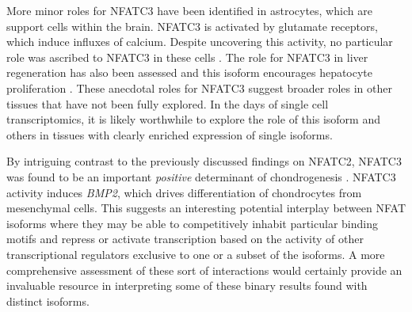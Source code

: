 More minor roles for NFATC3 have been identified in astrocytes, which are support cells within the brain. NFATC3 is activated by glutamate receptors, which induce influxes of calcium. Despite uncovering this activity, no particular role was ascribed to NFATC3 in these cells \citep{Jones2003}. The role for NFATC3 in liver regeneration has also been assessed and this isoform encourages hepatocyte proliferation \citep{Pierre2009}. These anecdotal roles for NFATC3 suggest broader roles in other tissues that have not been fully explored. In the days of single cell transcriptomics, it is likely worthwhile to explore the role of this isoform and others in tissues with clearly enriched expression of single isoforms.

By intriguing contrast to the previously discussed findings on NFATC2, NFATC3 was found to be an important \textit{positive} determinant of chondrogenesis \citep{Ranger2000, Tomita2002}. NFATC3 activity induces \textit{BMP2}, which drives differentiation of chondrocytes from mesenchymal cells. This suggests an interesting potential interplay between NFAT isoforms where they may be able to competitively inhabit particular binding motifs and repress or activate transcription based on the activity of other transcriptional regulators exclusive to one or a subset of the isoforms. A more comprehensive assessment of these sort of interactions would certainly provide an invaluable resource in interpreting some of these binary results found with distinct isoforms.

